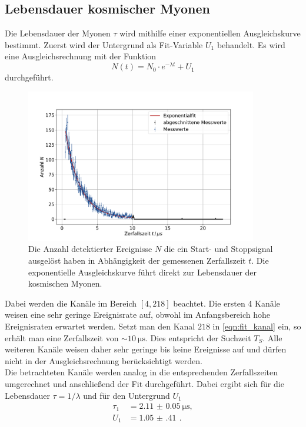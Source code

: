\subsection{Lebensdauer kosmischer Myonen}
Die Lebensdauer der Myonen $\tau$ wird mithilfe einer exponentiellen Ausgleichskurve bestimmt.
Zuerst wird der Untergrund als Fit-Variable $U_1$ behandelt.
Es wird eine Ausgleichsrechnung mit der Funktion
\begin{equation}
    N(t) = N_0 \cdot e^{- \lambda t} + U_1
\end{equation}
durchgeführt.
\begin{figure}
    \centering
    \includegraphics[width=0.9\textwidth]{content/plots/lifetime.pdf}
    \caption{Die Anzahl detektierter Ereignisse $N$ die ein Start- und Stoppsignal ausgelöst haben in Abhängigkeit der gemessenen Zerfallszeit $t$.
    Die exponentielle Ausgleichskurve führt direkt zur Lebensdauer der kosmischen Myonen.
    }
    \label{fig:lebensdauer1}
\end{figure}
Dabei werden die Kanäle im Bereich $[4, 218]$ beachtet.
Die ersten 4 Kanäle weisen eine sehr geringe Ereignisrate auf, obwohl im Anfangsbereich hohe Ereignisraten erwartet werden.
Setzt man den Kanal $218$ in \autoref{eqn:fit_kanal} ein, so erhält man eine Zerfallszeit von $\sim \qty{10}{\micro\second}$.
Dies entspricht der Suchzeit $T_S$.
Alle weiteren Kanäle weisen daher sehr geringe bis keine Ereignisse auf und dürfen nicht in der Ausgleichsrechnung berücksichtigt werden.
\\
Die betrachteten Kanäle werden analog in die entsprechenden Zerfallszeiten umgerechnet und anschließend der Fit durchgeführt.
Dabei ergibt sich für die Lebensdauer $\tau = 1/\lambda$ und für den Untergrund $U_1$
\begin{align}
    \tau_1 &= \qty{2.11(5)}{\micro\second},\\
    U_1 &= \qty{1.05(41)}{} \,.
\end{align}
